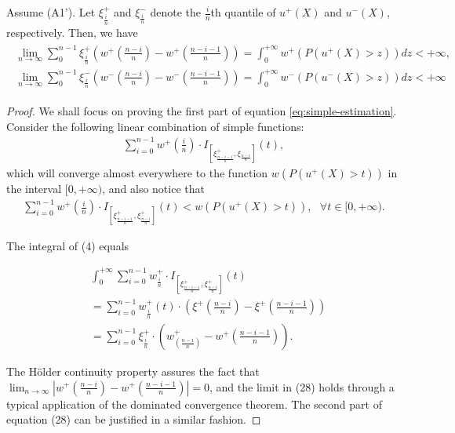 \begin{proposition}
\label{prop:holder-quantile}
Assume (A1'). Let $\xi^+_{\frac{i}{n}}$ and $\xi^-_{\frac{i}{n}}$ denote the $\frac{i}{n}$th quantile of $u^+(X)$ and $u^-(X)$, respectively. Then, we have 
\begin{align}
\label{eq:simple-estimation}
\begin{split}
\lim_{n \rightarrow \infty} \sum_0^{n-1} \xi^+_{\frac{i}{n}} (w^+(\frac{n-i}{n})- w^+(\frac{n-i-1}{n}) ) = \int_0^{+\infty} w^+(P(u^+(X)>z)) dz < +\infty,
\\
\lim_{n \rightarrow \infty} \sum_0^{n-1} \xi^-_{\frac{i}{n}} (w^-(\frac{n-i}{n})- w^-(\frac{n-i-1}{n}) ) = \int_0^{+\infty} w^-(P(u^-(X)>z)) dz < +\infty
\end{split}
\end{align}
\end{proposition}


\begin{proof}
We shall focus on proving the first part of equation \eqref{eq:simple-estimation}. Consider the following linear combination of simple functions: 
\begin{align}
\sum_{i=0}^{n-1} w^+ (\frac{i}{n}) 
\cdot I_{[\xi^+_\frac{n-i-1}{n}, \xi_\frac{n-i}{n}]}(t),
\end{align}
which will converge almost everywhere to the function $w(P(u^{+}(X)>t))$ in the interval $[0, +\infty)$, and also notice that 
\begin{align}
\sum_{i=0}^{n-1} w^+ (\frac{i}{n}) 
\cdot I_{[\xi^+_\frac{n-i-1}{n}, \xi^+_\frac{n-i}{n}]}(t)
<
w(P(u^{+}(X)>t)),
\text{         } \forall t \in [0,+\infty).
\end{align}

The integral of (4) equals  

\begin{align}
& \int_0^{+\infty} \sum_{i=0}^{n-1} w^+_{\frac{i}{n}} \cdot I_{[\xi^+_\frac{n-i-1}{n},
\xi^+_\frac{n-i}{n}]}(t) \\ & = \sum_{i=0}^{n-1} w^+_{\frac{i}{n}}(t) \cdot (\xi^+(\frac{n-i}{n}) -
\xi^+(\frac{n-i-1}{n})) \\ & = \sum_{i=0}^{n-1} \xi^+_{\frac{i}{n}} \cdot (w^+_(\frac{n-i}{n})-
    w^+(\frac{n-i-1}{n})).
\end{align}

The H\"{o}lder continuity property assures the fact that 
$\lim_{n \rightarrow \infty}  | w^+(\frac{n-i}{n})- w^+(\frac{n-i-1}{n})| =0$, and the limit in (28) holds through a typical application of the dominated convergence theorem.
The second part of equation (28) can be justified in a similar fashion.
\end{proof} 

